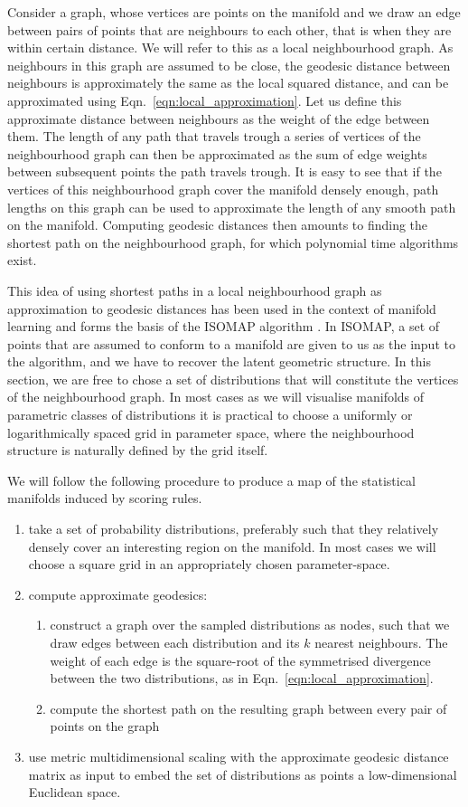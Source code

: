 Consider a graph, whose vertices are points on the manifold and we draw an edge between pairs of points that are neighbours to each other, that is when they are within certain distance. We will refer to this as a local neighbourhood graph. As neighbours in this graph are assumed to be close, the geodesic distance between neighbours is approximately the same as the local squared distance, and can be approximated using Eqn.\ \ref{eqn:local_approximation}. Let us define this approximate distance between neighbours as the weight of the edge between them. The length of any path that travels trough a series of vertices of the neighbourhood graph can then be approximated as the sum of edge weights between subsequent points the path travels trough. It is easy to see that if the vertices of this neighbourhood graph cover the manifold densely enough, path lengths on this graph can be used to approximate the length of any smooth path on the manifold. Computing geodesic distances then amounts to finding the shortest path on the neighbourhood graph, for which polynomial time algorithms exist.

This idea of using shortest paths in a local neighbourhood graph as approximation to geodesic distances has been used in the context of manifold learning and forms the basis of the ISOMAP algorithm \citep{Tenenbaum2000}. In ISOMAP, a set of points that are assumed to conform to a manifold are given to us as the input to the algorithm, and we have to recover the latent geometric structure. In this section, we are free to chose a set of distributions that will constitute the vertices of the neighbourhood graph. In most cases as we will visualise manifolds of parametric classes of distributions it is practical to choose a uniformly or logarithmically spaced grid in parameter space, where the neighbourhood structure is naturally defined by the grid itself.

We will follow the following procedure to produce a map of the statistical manifolds induced by scoring rules.

\begin{enumerate}
\item take a set of probability distributions, preferably such that they relatively densely cover an interesting region on the manifold. In most cases we will choose a square grid in an appropriately chosen parameter-space.
\item compute approximate geodesics:
\begin{enumerate}
	\item construct a graph over the sampled distributions as nodes, such that we draw edges between each distribution and its $k$ nearest neighbours. The weight of each edge is the square-root of the symmetrised divergence between the two distributions, as in Eqn.\ \eqref{eqn:local_approximation}.
	\item compute the shortest path on the resulting graph between every pair of points on the graph
\end{enumerate}
\item use metric multidimensional scaling with the approximate geodesic distance matrix as input to embed the set of distributions as points a low-dimensional Euclidean space.
\end{enumerate}

